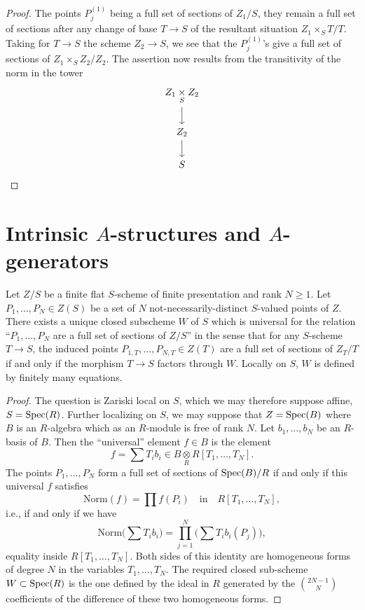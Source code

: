 \begin{proof}
The points $P_j^{(1)}$ being a full set of sections of $Z_1/S$, they remain a full set of sections after any change of base $T \to S$ of the resultant situation $Z_1 \times_S T/T$. Taking for $T \to S$ the scheme $Z_2 \to S$, we see that the $P_j^{(1)}$'s give a full set of sections of $Z_1 \times_S Z_2 / Z_2$. The assertion now results from the transitivity of the norm in the tower
\[
\begin{tikzcd}
Z_1 \underset{S}{\times} Z_2 \arrow[d] \\
Z_2 \arrow[d] \\
S
\end{tikzcd}\qedhere
\]
\end{proof}

\section{Intrinsic $A$-structures and $A$-generators}\label{sec:1.9}

\begin{proposition}\label{prop:1.9.1}
Let $Z/S$ be a finite flat $S$-scheme of finite presentation and rank $N \ge 1$. Let $P_1, \dots, P_N \in Z(S)$ be a set of $N$ not-necessarily-distinct $S$-valued points of $Z$. There exists a unique closed subscheme $W$ of $S$ which is universal for the relation ``$P_1, \dots, P_N$ are a full set of sections of $Z/S$'' in the sense that for any $S$-scheme $T \to S$, the induced points $P_{1,T}, \dots, P_{N,T} \in Z(T)$ are a full set of sections of $Z_T/T$ if and only if the morphism $T \to S$ factors through $W$. Locally on $S$, $W$ is defined by finitely many equations.
\end{proposition}

\begin{proof}
The question is Zariski local on $S$, which we may therefore suppose affine, $S = \operatorname{Spec}(R)$. Further localizing on $S$, we may suppose that $Z = \operatorname{Spec}(B)$ where $B$ is an $R$-algebra which as an $R$-module is free of rank $N$. Let $b_1, \dots, b_N$ be an $R$-basis of $B$. Then the ``universal'' element $f \in B$ is the element
\[
f = \sum T_i b_i \in B \underset{R}{\otimes} R[T_1, \dots, T_N].
\]
The points $P_1, \dots, P_N$ form a full set of sections of $\operatorname{Spec}(B)/R$ if and only if this universal $f$ satisfies
\[
\mathrm{Norm}(f) = \prod f(P_i) \quad \text{in} \quad R[T_1, \dots, T_N],
\]
i.e., if and only if we have
\[
\mathrm{Norm}\Biggl( \sum T_i b_i \Biggr) = \prod_{j=1}^N \Biggl( \sum T_i b_i(P_j) \Biggr),
\]
equality inside $R[T_1, \dots, T_N]$. Both sides of this identity are homogeneous forms of degree $N$ in the variables $T_1, \dots, T_N$. The required closed sub-scheme $W \subset \operatorname{Spec}(R)$ is the one defined by the ideal in $R$ generated by the $\binom{2N-1}{N}$ coefficients of the difference of these two homogeneous forms.
\end{proof}

